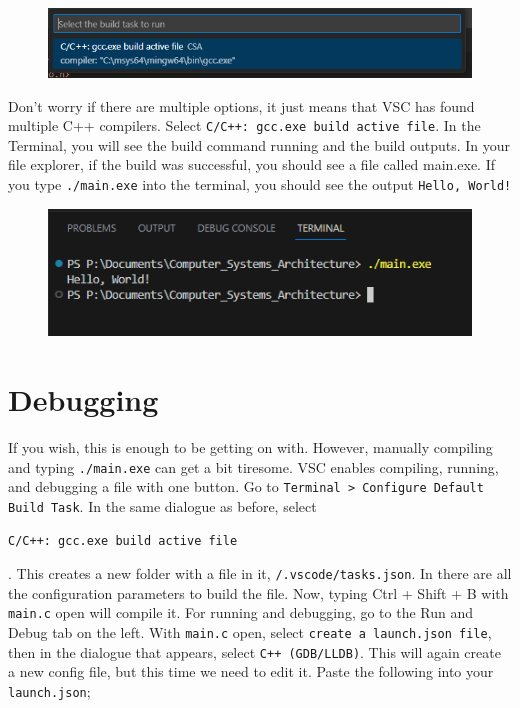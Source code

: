 \documentclass{article}
\begin{document}
\begin{figure}[h]
    \centering
    \includegraphics[width=0.5\linewidth]{Compiler.png}
    \label{fig:enter-label}
\end{figure}

Don't worry if there are multiple options, it just means that VSC has found multiple C++ compilers. Select \verb|C/C++: gcc.exe build active file|. In the Terminal, you will see the build command running and the build outputs. In your file explorer, if the build was successful, you should see a file called main.exe. If you type \verb|./main.exe| into the terminal, you should see the output \verb|Hello, World!|
\begin{figure}[h]
    \centering
    \includegraphics[width=0.5\linewidth]{output.png}
    \label{fig:enter-label}
\end{figure}

\section{Debugging}
If you wish, this is enough to be getting on with. However, manually compiling and typing \verb|./main.exe| can get a bit tiresome. VSC enables compiling, running, and debugging a file with one button. Go to  \verb|Terminal > Configure Default Build Task|. In the same dialogue as before, select \begin{verbatim}C/C++: gcc.exe build active file\end{verbatim}. This creates a new folder with a file in it, \verb|/.vscode/tasks.json|. In there are all the configuration parameters to build the file. Now, typing Ctrl + Shift + B with \verb|main.c| open will compile it. For running and debugging, go to the Run and Debug tab on the left. With \verb|main.c| open, select \verb|create a launch.json file|, then in the dialogue that appears, select \verb|C++ (GDB/LLDB)|. This will again create a new config file, but this time we need to edit it. Paste the following into your \verb|launch.json|;
\end{document}
